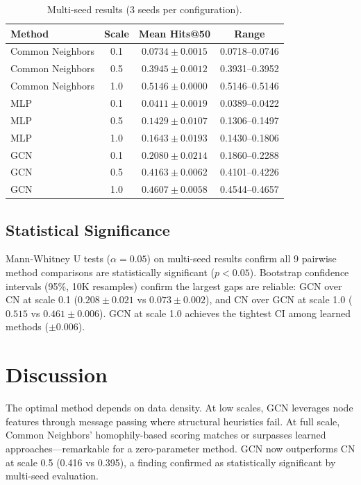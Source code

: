 \documentclass[12pt,a4paper]{article}
\begin{document}
\begin{table}[H]
\centering
\caption{Multi-seed results (3 seeds per configuration).}
\label{tab:multiseed}
\small
\begin{tabular}{lccc}
\toprule
\textbf{Method} & \textbf{Scale} & \textbf{Mean Hits@50} & \textbf{Range} \\
\midrule
Common Neighbors & 0.1 & $0.0734 \pm 0.0015$ & 0.0718--0.0746 \\
Common Neighbors & 0.5 & $0.3945 \pm 0.0012$ & 0.3931--0.3952 \\
Common Neighbors & 1.0 & $0.5146 \pm 0.0000$ & 0.5146--0.5146 \\
\midrule
MLP & 0.1 & $0.0411 \pm 0.0019$ & 0.0389--0.0422 \\
MLP & 0.5 & $0.1429 \pm 0.0107$ & 0.1306--0.1497 \\
MLP & 1.0 & $0.1643 \pm 0.0193$ & 0.1430--0.1806 \\
\midrule
GCN & 0.1 & $0.2080 \pm 0.0214$ & 0.1860--0.2288 \\
GCN & 0.5 & $0.4163 \pm 0.0062$ & 0.4101--0.4226 \\
GCN & 1.0 & $0.4607 \pm 0.0058$ & 0.4544--0.4657 \\
\bottomrule
\end{tabular}
\end{table}

\subsection{Statistical Significance}

Mann-Whitney U tests ($\alpha=0.05$) on multi-seed results confirm all 9 pairwise method comparisons are statistically significant ($p < 0.05$). Bootstrap confidence intervals (95\%, 10K resamples) confirm the largest gaps are reliable: GCN over CN at scale 0.1 ($0.208 \pm 0.021$ vs $0.073 \pm 0.002$), and CN over GCN at scale 1.0 ($0.515$ vs $0.461 \pm 0.006$). GCN at scale 1.0 achieves the tightest CI among learned methods ($\pm0.006$).

\section{Discussion}

The optimal method depends on data density. At low scales, GCN leverages node features through message passing where structural heuristics fail. At full scale, Common Neighbors' homophily-based scoring matches or surpasses learned approaches---remarkable for a zero-parameter method. GCN now outperforms CN at scale 0.5 (0.416 vs 0.395), a finding confirmed as statistically significant by multi-seed evaluation.
\end{document}
